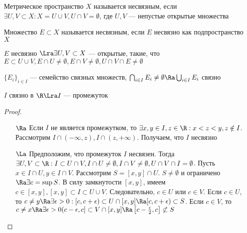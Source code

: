 \begin{definition}
    Метрическое пространство \(X\) называется несвязным, если \(\exists U, V \subset X: X = U \cup V, U \cap V = \emptyset\), где \(U, V\) --- непустые открытые множества
\end{definition}

\begin{definition}
    Множество \(E \subset X\) называется несвязным, если \(E\) несвязно как подпространство \(X\)
\end{definition}

\begin{note}
    \(E\) несвязно \(\Lra \exists U, V \subset X\) --- открытые, такие, что \(E \subset U \cup V, E \cap U \ne \emptyset, E \cap V \ne \emptyset, U \cap V \cap E \ne \emptyset\) 
\end{note}

\begin{problem}
    \(\{E_i\}_{i \in I}\) --- семейство связных множеств, \(\bigcap_{i \in I}E_i \ne \emptyset \Ra \bigcup_{i \in I}E_i\) связно
\end{problem}

\begin{theorem}
    \(I\) связно в \(\R \Lra I\) --- промежуток
\end{theorem}
\begin{proof}
    \begin{enumerate}
        \item[\(\Ra\)] Если \(I\) не является промежутком, то \(\exists x, y \in I, z \in \R: x < z < y, z \notin I\). Рассмотрим \(I \cap (-\infty, z), I \cap (z, +\infty)\). Получаем, что \(I\) несвязно
        \item[\(\La\)] Предположим, что промежуток \(I\) несвязен. Тогда \(\exists U, V \subset \R: I \subset U \cap V, I \cap U \ne \emptyset, I \cap V \ne \emptyset, U \cap V \cap I = \emptyset\). Пусть \(x \in I \cap U, y \in I \cap V\). Рассмотрим \(S = [x, y] \cap U\). \(S \ne \emptyset\) и ограничено \(\Ra \exists c = \sup S\). В силу замкнутости \([x, y]\), имеем \(c \in [x, y], [x, y] \subset I \subset U \cup V\). Следовательно, \(c \in U\) или \(c \in V\). Если \(c \in U\), то \(c \ne y \Ra \exists \epsilon > 0: [c, c + \epsilon) \subset U \cap [x, y] \Ra [c, c + \epsilon) \subset S\). Если \(c \in V\), то \(c \ne x \Ra \exists \epsilon > 0 (c - \epsilon, c] \subset V \cap [x, y] \Ra \left[c - \frac{\epsilon}{2}, c\right] \not\subset S\)
    \end{enumerate}
\end{proof}

